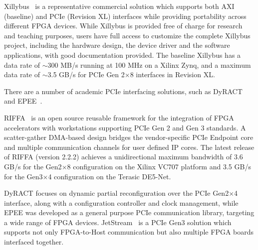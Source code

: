 Xillybus~\cite{xillybus2018} is a representative commercial solution which supports both AXI (baseline) and PCIe (Revision XL) interfaces while providing portability across different FPGA devices. 
While Xillybus is provided free of charge for research and teaching purposes, users have full access to customize the complete Xillybus project, including the hardware design, the device driver and the software applications, with good documentation provided. 
The baseline Xillybus has a data rate of $\sim$300 MB/s running at 100 MHz on a Xilinx Zynq, and a maximum data rate of $\sim$3.5 GB/s for PCIe Gen 2$\times$8 interfaces in Revision XL.

There are a number of academic PCIe interfacing solutions, such as DyRACT~\cite{vipin2014dyract} and EPEE~\cite{gong2014efficient}.

RIFFA~\cite{jacobsen2015riffa} is an open source reusable framework for the integration of FPGA accelerators with workstations supporting PCIe Gen 2 and Gen 3 standards. 
A scatter-gather DMA-based design bridges the vendor-specific PCIe Endpoint core and multiple communication channels for user defined IP cores. 
The latest release of RIFFA (version 2.2.2) achieves a unidirectional maximum bandwidth of 3.6 GB/s for the Gen2$\times$8 configuration on the Xilinx VC707 platform and 3.5 GB/s for the Gen3$\times$4 configuration on the Terasic DE5-Net.

DyRACT focuses on dynamic partial reconfiguration over the PCIe Gen2$\times$4 interface, along with a configuration controller and clock management, while EPEE was developed as a general purpose PCIe communication library, targeting a wide range of FPGA devices.
JetStream~\cite{vesper2016jetstream} is a PCIe Gen3 solution which supports not only FPGA-to-Host communication but also multiple FPGA boards interfaced together. 



